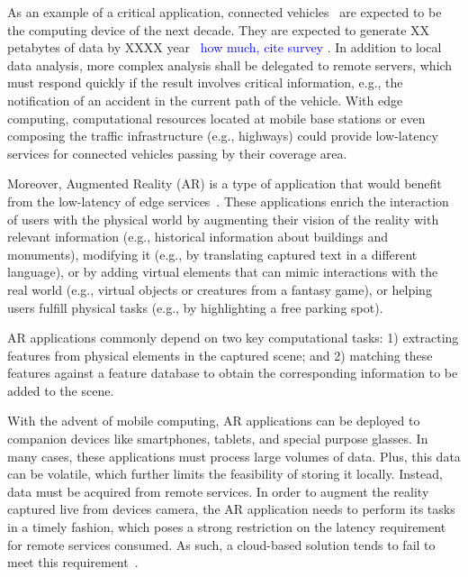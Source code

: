 As an example of a critical application, connected vehicles~\cite{} are expected to be the computing device of the next decade. They are expected to generate XX petabytes of data by XXXX year~\cite{connectedCars} \textcolor{blue}{how much, cite survey}
. In addition to local data analysis, more complex analysis shall be delegated to remote servers, which must respond quickly if the result involves critical information, e.g., the notification of an accident in the current path of the vehicle. With edge computing, computational resources located at mobile base stations or even composing the traffic infrastructure (e.g., highways) could provide low-latency services for connected vehicles passing by their coverage area.

Moreover, Augmented Reality (AR) is a type of application that would benefit from the low-latency of edge services~\cite{hu2015mobile,GarrigaMendonca2017}. These applications enrich the interaction of users with the physical
world by augmenting their vision of the reality with relevant information (e.g., historical information about buildings and monuments), modifying it (e.g., by translating captured text in a different language), or by adding virtual elements that can mimic interactions with the real world (e.g., virtual objects or creatures
from a fantasy game), or helping users fulfill physical tasks (e.g., by highlighting a free parking spot).

AR applications commonly depend on two key computational tasks: 1) extracting features from physical elements in the captured scene; and 2) matching these features against a feature database to obtain the corresponding information to be added to the scene. 

With the advent of mobile computing, AR applications can be deployed to companion devices like smartphones, tablets, and special purpose glasses. In many cases, these applications must process large volumes of data. Plus, this data can be volatile, which further limits the feasibility of storing it locally. Instead, data must be acquired from remote services. In order to augment the reality captured live from devices camera, the AR application needs to perform its tasks in a timely fashion, which poses a strong restriction on the latency requirement for remote services consumed. As such, a cloud-based solution tends to fail to meet this requirement~\cite{ServerlessEdgeESOCC17}. 


